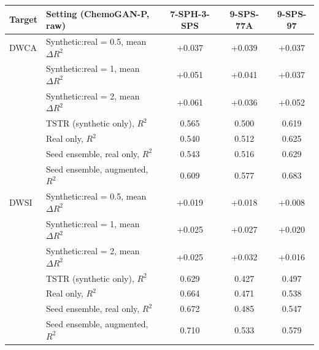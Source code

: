 \begin{tabular}{llccc}
\hline
\textbf{Target} & \textbf{Setting (ChemoGAN-P, raw)} & \textbf{7-SPH-3-SPS} & \textbf{9-SPS-77A} & \textbf{9-SPS-97} \\ \hline
DWCA & Synthetic:real = 0.5, mean $\Delta R^2$ & +0.037 & +0.039 & +0.037 \\
 & Synthetic:real = 1, mean $\Delta R^2$ & +0.051 & +0.041 & +0.037 \\
 & Synthetic:real = 2, mean $\Delta R^2$ & +0.061 & +0.036 & +0.052 \\
 & TSTR (synthetic only), $R^2$ & 0.565 & 0.500 & 0.619 \\
 & Real only, $R^2$ & 0.540 & 0.512 & 0.625 \\
 & Seed ensemble, real only, $R^2$ & 0.543 & 0.516 & 0.629 \\
 & Seed ensemble, augmented, $R^2$ & 0.609 & 0.577 & 0.683 \\
\hline
DWSI & Synthetic:real = 0.5, mean $\Delta R^2$ & +0.019 & +0.018 & +0.008 \\
 & Synthetic:real = 1, mean $\Delta R^2$ & +0.025 & +0.027 & +0.020 \\
 & Synthetic:real = 2, mean $\Delta R^2$ & +0.025 & +0.032 & +0.016 \\
 & TSTR (synthetic only), $R^2$ & 0.629 & 0.427 & 0.497 \\
 & Real only, $R^2$ & 0.664 & 0.471 & 0.538 \\
 & Seed ensemble, real only, $R^2$ & 0.672 & 0.485 & 0.547 \\
 & Seed ensemble, augmented, $R^2$ & 0.710 & 0.533 & 0.579 \\
\hline
\end{tabular}